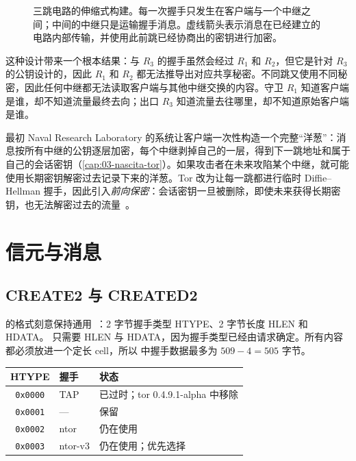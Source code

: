 \begin{figure}[htbp]
\centering

\caption{三跳电路的伸缩式构建。每一次握手只发生在客户端与一个中继之间；中间的中继只是运输握手消息。虚线箭头表示消息在已经建立的电路内部传输，并使用此前跳已经协商出的密钥进行加密。}
\label{fig:telescopio}
\end{figure}

这种设计带来一个根本结果：与 $R_3$ 的握手虽然会经过 $R_1$ 和 $R_2$，但它是针对 $R_3$ 的公钥设计的，因此 $R_1$ 和 $R_2$ 都无法推导出对应共享秘密。不同跳又使用不同秘密，因此任何中继都无法读取客户端与其他中继交换的内容。守卫 $R_1$ 知道客户端是谁，却不知道流量最终去向；出口 $R_3$ 知道流量去往哪里，却不知道原始客户端是谁。

\begin{storia}[第一代洋葱路由]
最初 Naval Research Laboratory 的系统让客户端一次性构造一个完整\enquote{洋葱}：消息按所有中继的公钥逐层加密，每个中继剥掉自己的一层，得到下一跳地址和属于自己的会话密钥（\cref{cap:03-nascita-tor}）。如果攻击者在未来攻陷某个中继，就可能使用长期密钥解密过去记录下来的洋葱。Tor 改为让每一跳都进行临时 Diffie--Hellman 握手，因此引入\emph{前向保密}：会话密钥一旦被删除，即使未来获得长期密钥，也无法解密过去的流量~\cite{dingledine2004tor}。
\end{storia}

\section{信元与消息}\label{sec:circ-celle}

\subsection{CREATE2 与 CREATED2}

 的格式刻意保持通用~：2 字节握手类型 HTYPE、2 字节长度 HLEN 和 HDATA。 只需要 HLEN 与 HDATA，因为握手类型已经由请求确定。所有内容都必须放进一个定长 cell，所以  中握手数据最多为 $509 - 4 = 505$ 字节。

\begin{center}
\begin{tabular}{cll}
\toprule
HTYPE & 握手 & 状态 \\
\midrule
\texttt{0x0000} & TAP & 已过时；tor 0.4.9.1-alpha 中移除 \\
\texttt{0x0001} & --- & 保留 \\
\texttt{0x0002} & ntor & 仍在使用 \\
\texttt{0x0003} & ntor-v3 & 仍在使用；优先选择 \\
\bottomrule
\end{tabular}
\end{center}

